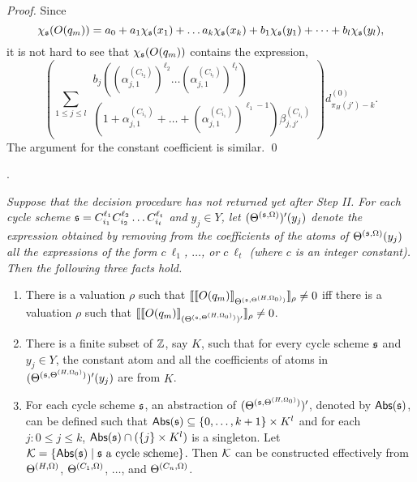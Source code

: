 \begin{appendix}
\begin{proof}
Since 
\[
\chi_{{\mathfrak{s} }}(O(q_m)) = a_0 + a_1 \chi_{{\mathfrak{s} }}(x_1) + \dots a_k \chi_{{\mathfrak{s} }}(x_k) + b_1 \chi_{{\mathfrak{s} }}(y_1) + \dots + b_l \chi_{{\mathfrak{s} }}(y_l),
\] 
it is not hard to see that $\chi_{\mathfrak{s} }(O(q_m))$ contains the expression,
\[
\left(\sum \limits_{1 \le j \le l} 
\begin{array}{l}
b_j \left((\alpha^{(C_{i_2})}_{j,1})^{\ell_2} \dots (\alpha^{(C_{i_t})}_{j,1})^{\ell_t}\right) \\
\left(1+\alpha^{(C_{i_1})}_{j,1} + \dots + (\alpha^{(C_{i_1})}_{j,1})^{\ell_1-1} \right) \beta^{(C_{i_1})}_{j,j'}
\end{array}
\right) d^{(0)}_{\pi_H(j')-k}. 
\]
The argument for the constant coefficient is similar.
\qed
\end{proof}




. 
{\it 
Suppose that the decision procedure has not returned yet after Step II. For each cycle scheme ${\mathfrak{s} }=C_{i_1}^{\ell_1} C_{i_2}^{\ell_2} \dots C_{i_t}^{\ell_t}$ and $y_j \in Y$, let $(\Theta^{({\mathfrak{s} },\Omega)})'(y_j)$ denote the expression obtained by removing from the coefficients of the atoms of $\Theta^{({\mathfrak{s} },\Omega)}(y_j)$ all the expressions of the form $c\ \ell_1$, $\dots$, or $c\ \ell_t$ (where $c$ is an integer constant).  Then the following three facts hold.
\begin{enumerate}
\item There is a valuation $\rho$ such that $\llbracket\llbracket O(q_m)\rrbracket_{\Theta^{({\mathfrak{s} }, \Theta^{(H,\Omega_0)})}}\rrbracket_{\rho}\neq 0$ iff there is a valuation $\rho$ such that $\llbracket\llbracket O(q_m)\rrbracket_{(\Theta^{({\mathfrak{s} }, \Theta^{(H,\Omega_0)})})'}\rrbracket_{\rho} \neq 0$.
%
\item There is a finite subset of ${\mathbb{Z} }$, say $K$, such that for every cycle scheme ${\mathfrak{s} }$ and $y_j \in Y$, the constant atom and all the coefficients of atoms in $(\Theta^{({\mathfrak{s} }, \Theta^{(H,\Omega_0)})})'(y_j)$ are from $K$. 
%
\item For each cycle scheme ${\mathfrak{s} }$, an abstraction of $(\Theta^{({\mathfrak{s} }, \Theta^{(H,\Omega_0)})})'$, denoted by $\mathsf{Abs}({\mathfrak{s} })$, can be defined such that $\mathsf{Abs}({\mathfrak{s} }) \subseteq \{0,\dots, k+1\} \times K^l$ and for each $j: 0 \le j \le k$,  $\mathsf{Abs}({\mathfrak{s} }) \cap (\{j\} \times K^l)$ is a singleton. Let ${\mathcal{K}}=\{\mathsf{Abs}({\mathfrak{s} }) \mid {\mathfrak{s} } \mbox{ a cycle scheme}\}$. Then ${\mathcal{K}}$ can be constructed effectively from $\Theta^{(H,\Omega)}$, $\Theta^{(C_1,\Omega)}$, $\dots$, and $\Theta^{(C_n,\Omega)}$.
\end{enumerate}
}


\end{appendix}
